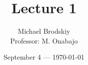


\title{Lecture 1}
\date{September 4 — \today}
\author{Michael Brodskiy\\ \small Professor: M. Onabajo}



\maketitle

